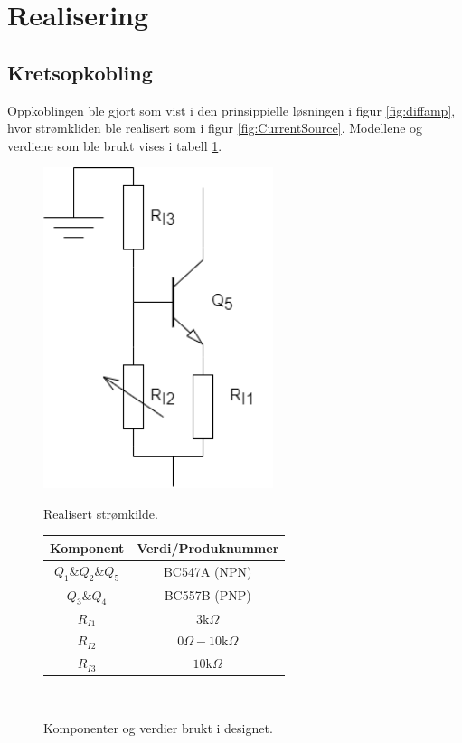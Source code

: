 \newpage
\section{Realisering}
\label{realiseringOgTest}

\subsection{Kretsopkobling}
Oppkoblingen ble gjort som vist i den prinsippielle løsningen i figur \ref{fig:diffamp}, hvor strømkliden ble realisert som i figur \ref{fig:CurrentSource}. Modellene og verdiene som ble brukt vises i tabell \ref{tab:komnpomenter}. 

\begin{figure}[!h]
    \centering
    \begin{minipage}[c]{0.4\textwidth}
        \centering
        \includegraphics[width=0.6\textwidth]{Bilder/current_source.drawio.png} 
        \caption{Realisert strømkilde.}
        \label{fig:CurrentSource}
    \end{minipage}
    \hfill
    \begin{minipage}[c]{0.5\textwidth}
        \centering
        \begin{tabular}{ |c|c| }
            \hline
            Komponent & Verdi/Produknummer \\ \hline
            \hline
            $Q_1 \& Q_2 \&Q_5$ & BC547A (NPN) \\
            $Q_3 \& Q_4$ & BC557B (PNP) \\
            $R_{I1}$ & $3\text{k}\Omega $ \\
            $R_{I2}$ & $0\Omega - 10\text{k}\Omega$ \\
            $R_{I3}$ & $10\text{k}\Omega$ \\
            \hline
        \end{tabular}
        \\[60pt]
        \caption{Komponenter og verdier brukt i designet.}
        \label{tab:komnpomenter}
    \end{minipage}
\end{figure}


